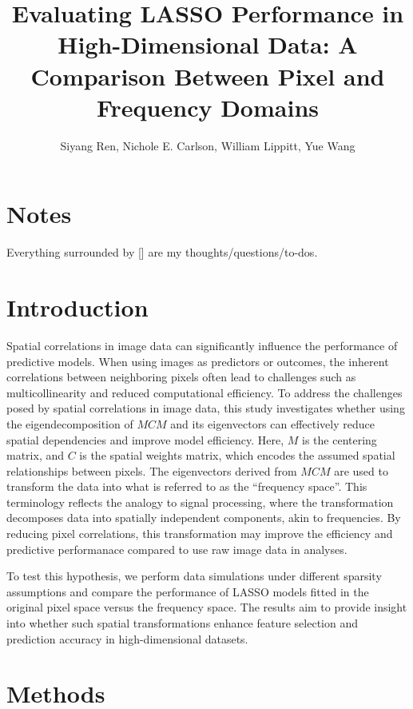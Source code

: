 \documentclass[12pt]{article}
\begin{document}
\title{Evaluating LASSO Performance in High-Dimensional Data: A Comparison Between Pixel and Frequency Domains}
\author{Siyang Ren, Nichole E. Carlson, William Lippitt, Yue Wang}
\date{}
\maketitle


\section*{Notes}

Everything surrounded by [] are my thoughts/questions/to-dos.



\section{Introduction}

Spatial correlations in image data can significantly influence the performance of predictive models. When using images as predictors or outcomes, the inherent correlations between neighboring pixels often lead to challenges such as multicollinearity and reduced computational efficiency. To address the challenges posed by spatial correlations in image data, this study investigates whether using the eigendecomposition of \( M C M \) and its eigenvectors can effectively reduce spatial dependencies and improve model efficiency. Here, \( M \) is the centering matrix, and \( C \) is the spatial weights matrix, which encodes the assumed spatial relationships between pixels. The eigenvectors derived from \( M C M \) are used to transform the data into what is referred to as the ``frequency space''. This terminology reflects the analogy to signal processing, where the transformation decomposes data into spatially independent components, akin to frequencies. By reducing pixel correlations, this transformation may improve the efficiency and predictive performanace compared to use raw image data in analyses.

To test this hypothesis, we perform data simulations under different sparsity assumptions and compare the performance of LASSO models fitted in the original pixel space versus the frequency space. The results aim to provide insight into whether such spatial transformations enhance feature selection and prediction accuracy in high-dimensional datasets.



\section{Methods}
\end{document}
